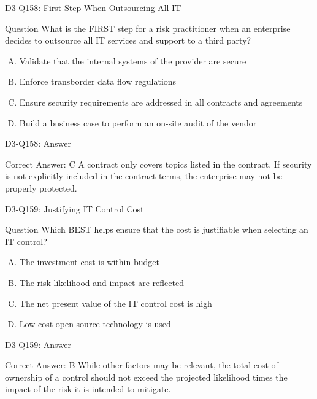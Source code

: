 \documentclass{beamer}
\begin{document}
	\begin{frame}{D3-Q158: First Step When Outsourcing All IT}
		\begin{block}{Question}
			What is the FIRST step for a risk practitioner when an enterprise decides to outsource all IT services and support to a third party?
		\end{block}
		\begin{enumerate}[(A)]
			\item Validate that the internal systems of the provider are secure
			\item Enforce transborder data flow regulations
			\item Ensure security requirements are addressed in all contracts and agreements
			\item Build a business case to perform an on-site audit of the vendor
		\end{enumerate}
	\end{frame}
	\begin{frame}{D3-Q158: Answer}
		\begin{block}{Correct Answer: C}
			A contract only covers topics listed in the contract. If security is not explicitly included in the contract terms, the enterprise may not be properly protected.
		\end{block}
	\end{frame}
	
	\begin{frame}{D3-Q159: Justifying IT Control Cost}
		\begin{block}{Question}
			Which BEST helps ensure that the cost is justifiable when selecting an IT control?
		\end{block}
		\begin{enumerate}[(A)]
			\item The investment cost is within budget
			\item The risk likelihood and impact are reflected
			\item The net present value of the IT control cost is high
			\item Low-cost open source technology is used
		\end{enumerate}
	\end{frame}
	\begin{frame}{D3-Q159: Answer}
		\begin{block}{Correct Answer: B}
			While other factors may be relevant, the total cost of ownership of a control should not exceed the projected likelihood times the impact of the risk it is intended to mitigate.
		\end{block}
	\end{frame}
	
\end{document}
